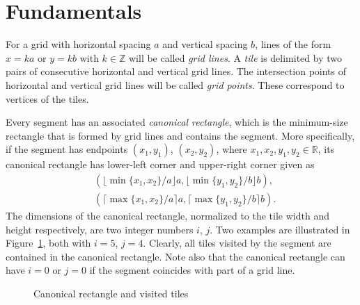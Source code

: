 \documentclass[12pt, a4paper]{article}
\begin{document}
\section{Fundamentals}
\label{part: fund results}

For a grid with horizontal spacing $a$ and vertical spacing $b$, lines of the form $x = ka$ or $y = kb$ with $k \in \mathbb Z$ will be called \emph{grid lines}. A \emph{tile} is delimited by two pairs of consecutive horizontal and vertical grid lines. The intersection points of horizontal and vertical grid lines will be called \emph{grid points}. These correspond to vertices of the tiles.

Every segment has an associated \emph{canonical rectangle}, which is the minimum-size rectangle that is formed by grid lines and contains the segment. More specifically, if the segment has endpoints $(x_1,y_1)$, $(x_2,y_2)$, where $x_1, x_2, y_1, y_2 \in \mathbb R$, its canonical rectangle has lower-left corner and upper-right corner given as
\begin{align*}
& (\lfloor\min\{x_1, x_2\}/a\rfloor a, \lfloor\min\{y_1,y_2\}/b\rfloor b), \\
& (\lceil\max\{x_1, x_2\}/a \rceil a, \lceil\max\{y_1,y_2\}/b \rceil b).
\end{align*}
The dimensions of the canonical rectangle, normalized to the tile width and height respectively, are two integer numbers $i$, $j$. Two examples are illustrated in Figure~\ref{fig: canonical rectangle and touched tiles}, both with $i=5$, $j=4$. Clearly, all tiles visited by the segment are contained in the canonical rectangle. Note also that the canonical rectangle can have $i=0$ or $j=0$ if the segment coincides with part of a grid line.

\begin{figure}
\centering%
\hfill%
%
\caption{Canonical rectangle and visited tiles
}%
\label{fig: canonical rectangle and touched tiles}%
\end{figure}%
\end{document}
